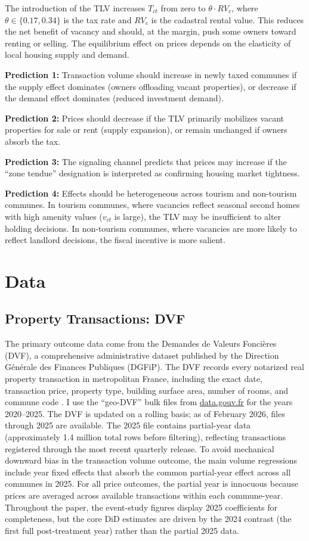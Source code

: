 \documentclass[12pt]{article}
\begin{document}
The introduction of the TLV increases $T_{ct}$ from zero to $\theta \cdot RV_c$, where $\theta \in \{0.17, 0.34\}$ is the tax rate and $RV_c$ is the cadastral rental value. This reduces the net benefit of vacancy and should, at the margin, push some owners toward renting or selling. The equilibrium effect on prices depends on the elasticity of local housing supply and demand.

\textbf{Prediction 1:} Transaction volume should increase in newly taxed communes if the supply effect dominates (owners offloading vacant properties), or decrease if the demand effect dominates (reduced investment demand).

\textbf{Prediction 2:} Prices should decrease if the TLV primarily mobilizes vacant properties for sale or rent (supply expansion), or remain unchanged if owners absorb the tax.

\textbf{Prediction 3:} The signaling channel predicts that prices may increase if the ``zone tendue'' designation is interpreted as confirming housing market tightness.

\textbf{Prediction 4:} Effects should be heterogeneous across tourism and non-tourism communes. In tourism communes, where vacancies reflect seasonal second homes with high amenity values ($v_{ct}$ is large), the TLV may be insufficient to alter holding decisions. In non-tourism communes, where vacancies are more likely to reflect landlord decisions, the fiscal incentive is more salient.


\section{Data}

\subsection{Property Transactions: DVF}

The primary outcome data come from the Demandes de Valeurs Fonci\`eres (DVF), a comprehensive administrative dataset published by the Direction G\'en\'erale des Finances Publiques (DGFiP). The DVF records every notarized real property transaction in metropolitan France, including the exact date, transaction price, property type, building surface area, number of rooms, and commune code \citep{dvf2024}. I use the ``geo-DVF'' bulk files from \url{data.gouv.fr} for the years 2020--2025. The DVF is updated on a rolling basis; as of February 2026, files through 2025 are available. The 2025 file contains partial-year data (approximately 1.4 million total rows before filtering), reflecting transactions registered through the most recent quarterly release. To avoid mechanical downward bias in the transaction volume outcome, the main volume regressions include year fixed effects that absorb the common partial-year effect across all communes in 2025. For all price outcomes, the partial year is innocuous because prices are averaged across available transactions within each commune-year. Throughout the paper, the event-study figures display 2025 coefficients for completeness, but the core DiD estimates are driven by the 2024 contrast (the first full post-treatment year) rather than the partial 2025 data.
\end{document}
